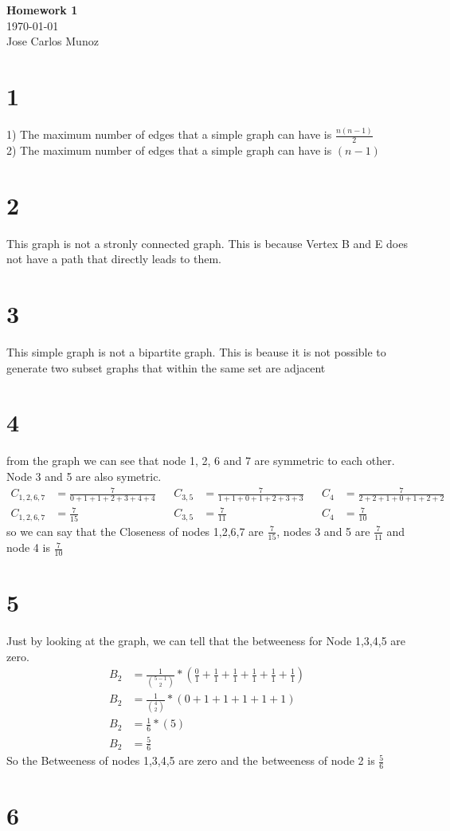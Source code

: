 \documentclass[12pt,english]{article}
\begin{document}
\begin{center}
    \Large
    \textbf{Homework 1}\\
    \small
    \today\\
    \large
    Jose Carlos Munoz
\end{center}
\section*{1}
1) The maximum number of edges that a simple graph can have is $\frac{n(n-1)}{2}$\\
2) The maximum number of edges that a simple graph can have is $(n-1)$\\
\section*{2}
This graph is not a stronly connected graph. This is because Vertex B and E does not have a path that directly leads to them. 
\section*{3}
This simple graph is not a bipartite graph. This is beause it is not possible to generate two subset graphs that within the same set are adjacent
\section*{4}
from the graph we can see that node 1, 2, 6 and 7 are symmetric to each other. Node 3 and 5 are also symetric.
\begin{align*}
C_{1,2,6,7}& =\frac{7}{0 +1 +1 +2 +3 +4 + 4} & & C_{3,5} & =\frac{7}{1 +1 +0 +1 +2 +3 + 3} & &C_4 & =\frac{7}{2 + 2 + 1 + 0 + 1 + 2 + 2}\\
C_{1,2,6,7}& =\frac{7}{15}                             & & C_{3,5} &=\frac{7}{11}                              & &C_4 & =\frac{7}{10}
\end{align*}
so we can say that the Closeness of nodes 1,2,6,7 are $\frac{7}{15}$, nodes 3 and 5 are $\frac{7}{11}$ and node 4 is $\frac{7}{10}$
\section*{5}
Just by looking at the graph, we can tell that the betweeness for Node 1,3,4,5 are zero.
\begin{align*}
B_{2}& =\frac{1}{{5-1\choose 2}} * (\frac{0}{1}+\frac{1}{1}+\frac{1}{1}+\frac{1}{1}+\frac{1}{1}+\frac{1}{1})\\
B_{2}& =\frac{1}{{4\choose 2}} * (0 + 1+1+1+1+1)\\
B_{2} & =\frac{1}{6} * (5)\\
B_{2} & =\frac{5}{6}
\end{align*}
So the Betweeness of nodes 1,3,4,5 are zero and the betweeness of node 2 is $\frac{5}{6}$
\section*{6}
\end{document}
